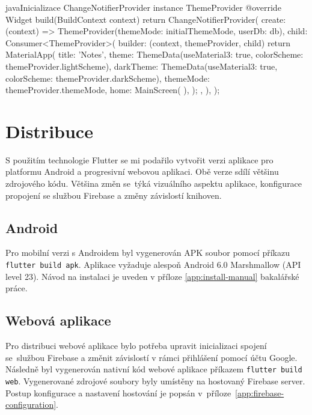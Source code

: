 \documentclass[czech, bc, kiv, he, iso690numb]{fasthesis}
\begin{document}
\begin{code}{java}{Inicializace ChangeNotifierProvider instance ThemeProvider \label{code:theme-listener}}
 @override
  Widget build(BuildContext context) {
    return ChangeNotifierProvider(
      create: (context) => ThemeProvider(themeMode: initialThemeMode, userDb: db),
      child: Consumer<ThemeProvider>(
        builder: (context, themeProvider, child) {
          return MaterialApp(
            title: 'Notes',
            theme: ThemeData(useMaterial3: true, colorScheme: themeProvider.lightScheme),
            darkTheme: ThemeData(useMaterial3: true, colorScheme: themeProvider.darkScheme),
            themeMode: themeProvider.themeMode,
            home: MainScreen(
            ),
          );
        },
      ),
    );
  }
\end{code}

\section{Distribuce}

S použitím technologie Flutter se mi podařilo vytvořit verzi aplikace pro platformu Android a progresivní webovou aplikaci. Obě verze sdílí většinu zdrojového kódu. Většina změn se~týká vizuálního aspektu aplikace, konfigurace propojení se službou Firebase a změny závislostí knihoven.

\subsection{Android}
Pro mobilní verzi s Androidem byl vygenerován \gls{APK} soubor pomocí příkazu \texttt{flutter build apk}. Aplikace vyžaduje alespoň Android 6.0 Marshmallow (\gls{API} level 23). Návod na instalaci je uveden v příloze \ref{app:install-manual} bakalářské práce. 

\subsection{Webová aplikace}
Pro distribuci webové aplikace bylo potřeba upravit inicializaci spojení se~službou Firebase a změnit závislostí v rámci přihlášení pomocí účtu Google. Následně byl vygenerován nativní kód webové aplikace příkazem \texttt{flutter build web}. Vygenerované zdrojové soubory byly umístěny na hostovaný Firebase server. Postup konfigurace a nastavení hostování je popsán v~příloze~\ref{app:firebase-configuration}. 


%
%
%
%
\end{document}
